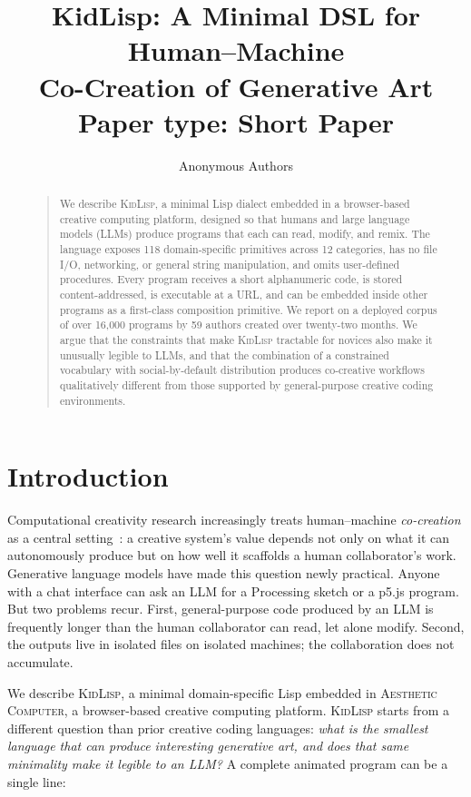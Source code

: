 \documentclass[letterpaper]{article}
\title{KidLisp: A Minimal DSL for Human--Machine\\Co-Creation of Generative Art \\
{\normalsize Paper type: Short Paper}}
\author{Anonymous Authors}
\begin{document}
\maketitle

\begin{abstract}
\begin{quote}
We describe \textsc{KidLisp}, a minimal Lisp dialect embedded in a browser-based creative computing platform, designed so that humans and large language models (LLMs) produce programs that each can read, modify, and remix. The language exposes 118 domain-specific primitives across 12 categories, has no file I/O, networking, or general string manipulation, and omits user-defined procedures. Every program receives a short alphanumeric code, is stored content-addressed, is executable at a URL, and can be embedded inside other programs as a first-class composition primitive. We report on a deployed corpus of over 16{,}000 programs by 59 authors created over twenty-two months. We argue that the constraints that make \textsc{KidLisp} tractable for novices also make it unusually legible to LLMs, and that the combination of a constrained vocabulary with social-by-default distribution produces co-creative workflows qualitatively different from those supported by general-purpose creative coding environments.
\end{quote}
\end{abstract}

\section{Introduction}

Computational creativity research increasingly treats human--machine \emph{co-creation} as a central setting~\cite{kantosalo16,davis15}: a creative system's value depends not only on what it can autonomously produce but on how well it scaffolds a human collaborator's work. Generative language models have made this question newly practical. Anyone with a chat interface can ask an LLM for a Processing sketch or a p5.js program. But two problems recur. First, general-purpose code produced by an LLM is frequently longer than the human collaborator can read, let alone modify. Second, the outputs live in isolated files on isolated machines; the collaboration does not accumulate.

We describe \textsc{KidLisp}, a minimal domain-specific Lisp embedded in \textsc{Aesthetic Computer}, a browser-based creative computing platform. \textsc{KidLisp} starts from a different question than prior creative coding languages: \emph{what is the smallest language that can produce interesting generative art, and does that same minimality make it legible to an LLM?} A complete animated program can be a single line:
\end{document}
